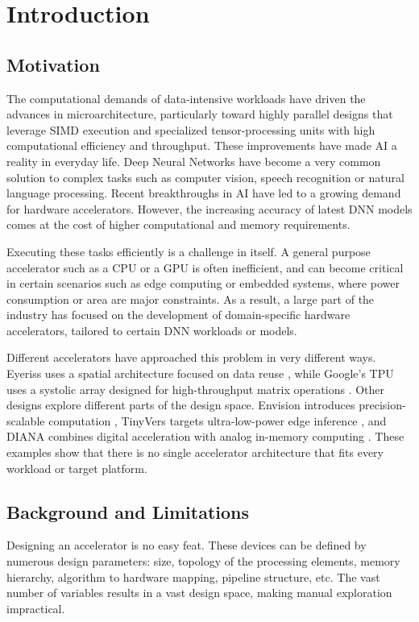 \clearpage
\newpage
\section{Introduction}
\subsection{Motivation}


The computational demands of data-intensive workloads have driven
the advances in microarchitecture, particularly toward highly
parallel designs that leverage SIMD execution and specialized 
tensor-processing units with high computational efficiency and
throughput. These improvements have made AI a reality in everyday
life. Deep Neural
Networks have become a very common solution to complex tasks such as
computer vision, speech recognition or natural language processing.
Recent breakthroughs in AI have led to a growing demand for hardware
accelerators. However, the increasing accuracy of latest DNN models
comes at the cost of higher computational and memory requirements.

Executing these tasks efficiently is a challenge in itself. A general
purpose accelerator such as a CPU or a GPU is often inefficient, and
can become critical in certain scenarios such as edge computing or
embedded systems, where power consumption or area are major
constraints. As a result, a large part of the industry has focused on
the development of domain-specific hardware accelerators, tailored to
certain DNN workloads or models.

Different accelerators have approached this problem in very different
ways. Eyeriss uses a spatial architecture focused on data reuse
\cite{eyeriss}, while Google's TPU uses a systolic array designed for
high-throughput matrix operations \cite{tpuv1}. Other designs explore
different parts of the design space. Envision introduces
precision-scalable computation \cite{envision}, TinyVers targets
ultra-low-power edge inference \cite{tinyvers}, and DIANA combines
digital acceleration with analog in-memory computing \cite{diana}.
These examples show that there is no single accelerator architecture
that fits every workload or target platform.

\subsection{Background and Limitations}
Designing an accelerator is no easy feat. These devices can be
defined by numerous design parameters: size, topology of the
processing elements, memory hierarchy, algorithm to hardware mapping,
pipeline structure, etc.
The vast number of variables results in a vast design space, making
manual exploration impractical.

